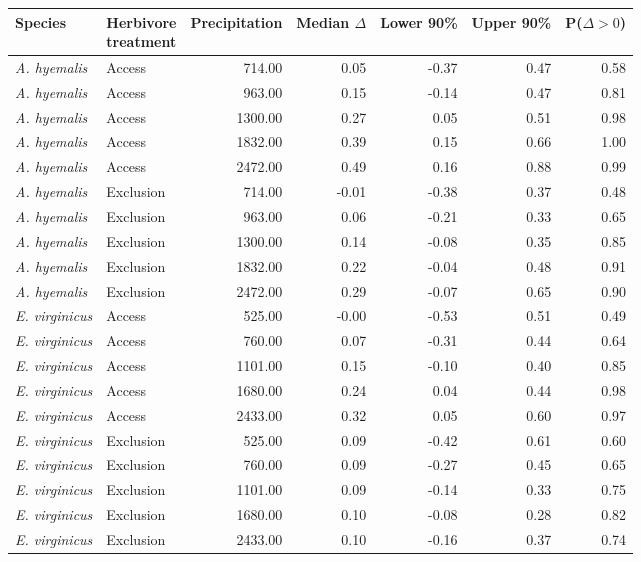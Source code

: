 \begin{tabular}{llrrrrr}
  \hline
Species & \makecell{Herbivore \\ treatment} & Precipitation & Median $\Delta$ & Lower 90\% & Upper 90\% & P($\Delta>0$) \\ 
  \hline
\textit{A. hyemalis} & Access & 714.00 & 0.05 & -0.37 & 0.47 & 0.58 \\ 
  \textit{A. hyemalis} & Access & 963.00 & 0.15 & -0.14 & 0.47 & 0.81 \\ 
  \textit{A. hyemalis} & Access & 1300.00 & 0.27 & 0.05 & 0.51 & 0.98 \\ 
  \textit{A. hyemalis} & Access & 1832.00 & 0.39 & 0.15 & 0.66 & 1.00 \\ 
  \textit{A. hyemalis} & Access & 2472.00 & 0.49 & 0.16 & 0.88 & 0.99 \\ 
  \textit{A. hyemalis} & Exclusion & 714.00 & -0.01 & -0.38 & 0.37 & 0.48 \\ 
  \textit{A. hyemalis} & Exclusion & 963.00 & 0.06 & -0.21 & 0.33 & 0.65 \\ 
  \textit{A. hyemalis} & Exclusion & 1300.00 & 0.14 & -0.08 & 0.35 & 0.85 \\ 
  \textit{A. hyemalis} & Exclusion & 1832.00 & 0.22 & -0.04 & 0.48 & 0.91 \\ 
  \textit{A. hyemalis} & Exclusion & 2472.00 & 0.29 & -0.07 & 0.65 & 0.90 \\ 
  \textit{E. virginicus} & Access & 525.00 & -0.00 & -0.53 & 0.51 & 0.49 \\ 
  \textit{E. virginicus} & Access & 760.00 & 0.07 & -0.31 & 0.44 & 0.64 \\ 
  \textit{E. virginicus} & Access & 1101.00 & 0.15 & -0.10 & 0.40 & 0.85 \\ 
  \textit{E. virginicus} & Access & 1680.00 & 0.24 & 0.04 & 0.44 & 0.98 \\ 
  \textit{E. virginicus} & Access & 2433.00 & 0.32 & 0.05 & 0.60 & 0.97 \\ 
  \textit{E. virginicus} & Exclusion & 525.00 & 0.09 & -0.42 & 0.61 & 0.60 \\ 
  \textit{E. virginicus} & Exclusion & 760.00 & 0.09 & -0.27 & 0.45 & 0.65 \\ 
  \textit{E. virginicus} & Exclusion & 1101.00 & 0.09 & -0.14 & 0.33 & 0.75 \\ 
  \textit{E. virginicus} & Exclusion & 1680.00 & 0.10 & -0.08 & 0.28 & 0.82 \\ 
  \textit{E. virginicus} & Exclusion & 2433.00 & 0.10 & -0.16 & 0.37 & 0.74 \\ 

\end{tabular}
